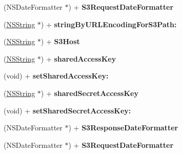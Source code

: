\begin{DoxyCompactItemize}
\item 
\hypertarget{interface_a_s_i_s3_request_ac2da1def71701c5ed345a2e119dad803}{
(\-N\-S\-Date\-Formatter $\ast$) + {\bfseries \-S3\-Request\-Date\-Formatter}}
\label{interface_a_s_i_s3_request_ac2da1def71701c5ed345a2e119dad803}

\item 
\hypertarget{interface_a_s_i_s3_request_aab8bdd9f5d8970a3bcfca36ec9dee9fb}{
(\hyperlink{class_n_s_string}{\-N\-S\-String} $\ast$) + {\bfseries string\-By\-U\-R\-L\-Encoding\-For\-S3\-Path\-:}}
\label{interface_a_s_i_s3_request_aab8bdd9f5d8970a3bcfca36ec9dee9fb}

\item 
\hypertarget{interface_a_s_i_s3_request_ae49e83f64fb2490185d0a9ff3649e1d3}{
(\hyperlink{class_n_s_string}{\-N\-S\-String} $\ast$) + {\bfseries \-S3\-Host}}
\label{interface_a_s_i_s3_request_ae49e83f64fb2490185d0a9ff3649e1d3}

\item 
\hypertarget{interface_a_s_i_s3_request_aadbf1f29ab30efc3f4640bac7b508d32}{
(\hyperlink{class_n_s_string}{\-N\-S\-String} $\ast$) + {\bfseries shared\-Access\-Key}}
\label{interface_a_s_i_s3_request_aadbf1f29ab30efc3f4640bac7b508d32}

\item 
\hypertarget{interface_a_s_i_s3_request_ad944a2a1b20fc9e4559c8faf4f41b977}{
(void) + {\bfseries set\-Shared\-Access\-Key\-:}}
\label{interface_a_s_i_s3_request_ad944a2a1b20fc9e4559c8faf4f41b977}

\item 
\hypertarget{interface_a_s_i_s3_request_af1a72a1aacc05ce3f5def339d3bfbd5f}{
(\hyperlink{class_n_s_string}{\-N\-S\-String} $\ast$) + {\bfseries shared\-Secret\-Access\-Key}}
\label{interface_a_s_i_s3_request_af1a72a1aacc05ce3f5def339d3bfbd5f}

\item 
\hypertarget{interface_a_s_i_s3_request_aca8ba2305c0cbee1d7ec8553831768ff}{
(void) + {\bfseries set\-Shared\-Secret\-Access\-Key\-:}}
\label{interface_a_s_i_s3_request_aca8ba2305c0cbee1d7ec8553831768ff}

\item 
\hypertarget{interface_a_s_i_s3_request_ac0d60115b59954ffcc2e293c60321a74}{
(\-N\-S\-Date\-Formatter $\ast$) + {\bfseries \-S3\-Response\-Date\-Formatter}}
\label{interface_a_s_i_s3_request_ac0d60115b59954ffcc2e293c60321a74}

\item 
\hypertarget{interface_a_s_i_s3_request_ac2da1def71701c5ed345a2e119dad803}{
(\-N\-S\-Date\-Formatter $\ast$) + {\bfseries \-S3\-Request\-Date\-Formatter}}
\label{interface_a_s_i_s3_request_ac2da1def71701c5ed345a2e119dad803}


\end{DoxyCompactItemize}
